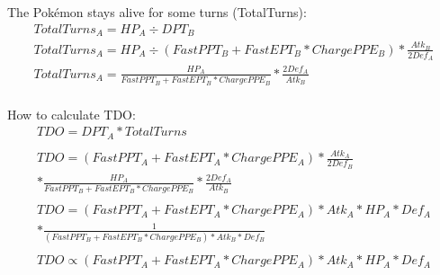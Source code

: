 \documentclass{article}
\begin{document}
The Pokémon stays alive for some turns (TotalTurns):
\begin{equation}
  \begin{aligned}
    TotalTurns_A = HP_A \div DPT_B \\
    TotalTurns_A = HP_A \div (FastPPT_B + FastEPT_B * ChargePPE_B) * \frac{Atk_B}{2Def_A} \\
    TotalTurns_A = \frac{HP_A}{FastPPT_B + FastEPT_B * ChargePPE_B} * \frac{2Def_A}{Atk_B} \\
  \end{aligned}
\end{equation}


How to calculate TDO:
\begin{equation}
  \begin{aligned}
    TDO = DPT_A * TotalTurns \\ \\
    TDO = (FastPPT_A + FastEPT_A * ChargePPE_A) * \frac{Atk_A}{2Def_B} \\
      * \frac{HP_A}{FastPPT_B + FastEPT_B * ChargePPE_B} * \frac{2Def_A}{Atk_B} \\ \\
    TDO = (FastPPT_A + FastEPT_A * ChargePPE_A) * Atk_A * HP_A * Def_A \\
      * \frac{1}{(FastPPT_B + FastEPT_B * ChargePPE_B) * Atk_B * Def_B} \\ \\
    TDO \propto (FastPPT_A + FastEPT_A * ChargePPE_A) * Atk_A * HP_A * Def_A
  \end{aligned}
\end{equation}


\end{document}
